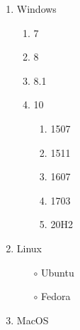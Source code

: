 \documentclass[12pt]{article}
\begin{document}
\begin{enumerate}[label= \Alph*.]

\item Windows

\begin{enumerate}[label= \roman*.]\addtocounter{enumii}{6}

\item 7
\item 8
\item 8.1
\item 10

\begin{enumerate}[label= \alph*.)]

\item 1507
\item 1511
\item 1607
\item 1703
\item 20H2

\end{enumerate}

\end{enumerate}

\item Linux

\begin{itemize}
\item[$\circ$] Ubuntu
\item[$\circ$] Fedora
\end{itemize}

\item MacOS

\end{enumerate}
\end{document}

